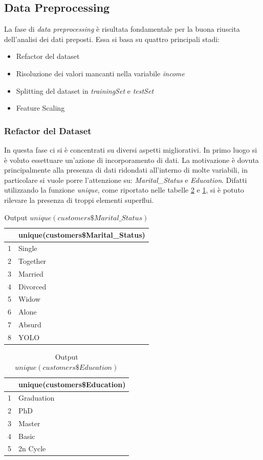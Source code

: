 \documentclass[letterpaper,11pt]{article}
\begin{document}
\subsection{Data Preprocessing}
La fase di \textit{data preprocessing} è risultata fondamentale per la buona riuscita dell'analisi dei dati preposti. Essa si basa su quattro principali stadi:
\begin{itemize}
    \item Refactor del dataset
    \item Risoluzione dei valori mancanti nella variabile \textit{income}
    \item Splitting del dataset in \textit{trainingSet} e \textit{testSet}
    \item Feature Scaling
\end{itemize}
\subsubsection{Refactor del Dataset}
In questa fase ci si è concentrati su diversi aspetti migliorativi. In primo luogo si è voluto essettuare un'azione di incorporamento di dati. La motivazione è dovuta principalmente alla presenza di dati ridondati all'interno di molte variabili, in particolare si vuole porre l'attenzione su: \textit{Marital\_Status} e \textit{Education}. Difatti utilizzando la funzione \textit{unique}, come riportato nelle tabelle \ref{fig:unique(customersEducation)} e \ref{fig:unique(customersMaritalStatus)}, si è potuto rilevare la presenza di troppi elementi superflui.
\begin{table}[h!t]
\centering
\begin{tabular}{rl}
  \hline
 & unique(customers\$Marital\_Status) \\ 
  \hline
1 & Single \\ 
  2 & Together \\ 
  3 & Married \\ 
  4 & Divorced \\ 
  5 & Widow \\ 
  6 & Alone \\ 
  7 & Absurd \\ 
  8 & YOLO \\ 
  \hline
\end{tabular}
\caption{Output $unique(customers\$Marital\_Status)$}
\label{fig:unique(customersMaritalStatus)}
\end{table}

\begin{table}[h!t]
\centering
\begin{tabular}{rl}
  \hline
 & unique(customers\$Education) \\ 
  \hline
1 & Graduation \\ 
  2 & PhD \\ 
  3 & Master \\ 
  4 & Basic \\ 
  5 & 2n Cycle \\ 
  \hline
\end{tabular}
\caption{Output $unique(customers\$Education)$}
\label{fig:unique(customersEducation)}
\end{table}
\end{document}
